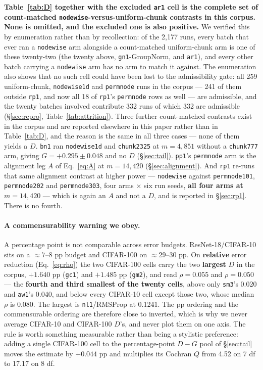 \documentclass[10pt,letterpaper]{article}
\newcommand{\Dstat}{D}                         %
\newcommand{\Gstat}{G}                         %
\newcommand{\Astat}{A}                         %
\newcommand{\arm}[1]{\texttt{#1}}
\begin{document}
\textbf{Table~\ref{tab:D} together with the excluded \arm{ar1} cell is the complete set of
count-matched \arm{nodewise}-versus-uniform-chunk contrasts in this corpus. None is omitted, and
the excluded one is also positive.} We verified this by enumeration rather than by recollection:
of the 2{,}177 runs, every batch that ever ran a \arm{nodewise} arm alongside a count-matched
uniform-chunk arm is one of these twenty-two (the twenty above, \arm{gn1}-GroupNorm, and
\arm{ar1}), and every other batch carrying a \arm{nodewise} arm has no arm to match it against.
The enumeration also shows that no such cell could have been lost to the admissibility gate: all
259 uniform-chunk, \arm{nodewise1d} and \arm{permnode} runs in the corpus --- 241 of them outside
\arm{rp1}, and now all 18 of \arm{rp1}'s \arm{permnode} rows as well --- are admissible, and the
twenty batches involved contribute 332 runs of which 332 are admissible
(\S\ref{sec:repro}, Table~\ref{tab:attrition}). Three further count-matched contrasts exist in the
corpus and are reported elsewhere in this paper rather than in Table~\ref{tab:D}, and the reason
is the same in all three cases --- none of them yields a $\Dstat$. \arm{bn1} ran \arm{nodewise1d}
and \arm{chunk2325} at $m = 4{,}851$ without a \arm{chunk777} arm, giving
$\Gstat = +0.295 \pm 0.048$ and no $\Dstat$ (\S\ref{sec:tail}). \arm{pp1}'s \arm{permnode} arm is
the alignment leg $\Astat$ of Eq.~\ref{eq:A} at $m = 14{,}420$ (\S\ref{sec:alignment}). And
\arm{rp1} re-runs that same alignment contrast at higher power --- \arm{nodewise} against
\arm{permnode101}, \arm{permnode202} and \arm{permnode303}, four arms $\times$ six run seeds,
\textbf{all four arms at $m = 14{,}420$} --- which is again an $\Astat$ and not a $\Dstat$, and is
reported in \S\ref{sec:rp1}. There is no fourth.

\paragraph{A commensurability warning we obey.}
A percentage point is not comparable across error budgets. ResNet-18/CIFAR-10 sits on a
$\approx 7$--8 pp budget and CIFAR-100 on $\approx 29$--30 pp. On \textbf{relative} error
reduction (Eq.~\ref{eq:rho}) the two CIFAR-100 cells carry the two \textbf{largest} $\Dstat$ in
the corpus, $+1.640$ pp (\arm{gc1}) and $+1.485$ pp (\arm{gm2}), and read $\rho = 0.055$ and
$\rho = 0.050$ --- the \textbf{fourth and third smallest of the twenty cells}, above only
\arm{sm3}'s 0.020 and \arm{aw1}'s 0.040, and below every CIFAR-10 cell except those two, whose
median $\rho$ is 0.080. The largest is \arm{nl1}/RMSProp at 0.1241. The pp ordering and the
commensurable ordering are therefore close to inverted, which is why
we never average CIFAR-10 and CIFAR-100 $\Dstat$'s, and
never plot them on one axis. The rule is worth something measurable rather than being a
stylistic preference: adding a single CIFAR-100 cell to the percentage-point
$\Dstat - \Gstat$ pool of \S\ref{sec:tail} moves the estimate by $+0.044$ pp and multiplies its
Cochran $Q$ from 4.52 on 7 df to 17.17 on 8 df.
\end{document}
